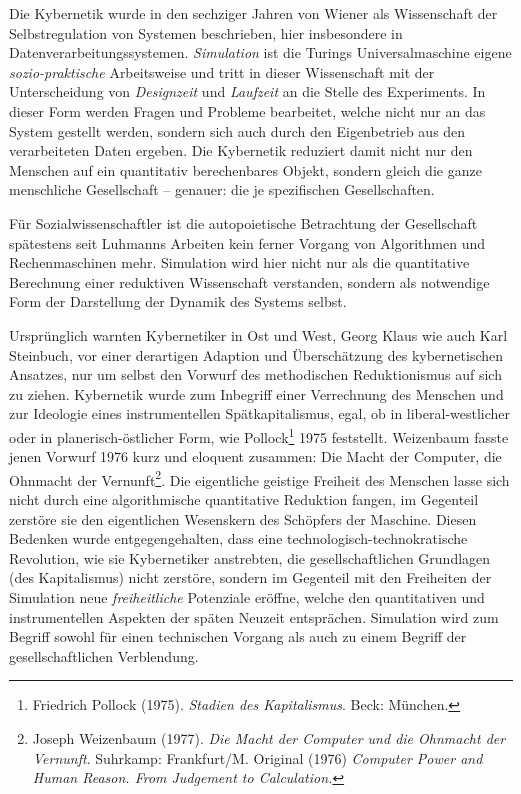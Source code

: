 \documentclass[12pt,a4paper]{article}
\begin{document}
Die Kybernetik wurde in den sechziger Jahren von Wiener als Wissenschaft der
Selbstregulation von Systemen beschrieben, hier insbesondere in
Datenverarbeitungssystemen. \emph{Simulation} ist die Turings
Universalmaschine eigene \emph{sozio-praktische} Arbeitsweise und tritt in
dieser Wissenschaft mit der Unterscheidung von \emph{Designzeit} und
\emph{Laufzeit} an die Stelle des Experiments. In dieser Form werden Fragen
und Probleme bearbeitet, welche nicht nur an das System gestellt werden,
sondern sich auch durch den Eigenbetrieb aus den verarbeiteten Daten
ergeben. Die Kybernetik reduziert damit nicht nur den Menschen auf ein
quantitativ berechenbares Objekt, sondern gleich die ganze menschliche
Gesellschaft -- genauer: die je spezifischen Gesellschaften.

Für Sozialwissenschaftler ist die autopoietische Betrachtung der Gesellschaft
spätestens seit Luhmanns Arbeiten kein ferner Vorgang von Algorithmen und
Rechenmaschinen mehr. Simulation wird hier nicht nur als die quantitative
Berechnung einer reduktiven Wissenschaft verstanden, sondern als notwendige
Form der Darstellung der Dynamik des Systems selbst.

Ursprünglich warnten Kybernetiker in Ost und West, Georg Klaus wie auch Karl
Steinbuch, vor einer derartigen Adaption und Überschätzung des kybernetischen
Ansatzes, nur um selbst den Vorwurf des methodischen Reduktionismus auf sich
zu ziehen. Kybernetik wurde zum Inbegriff einer Verrechnung des Menschen und
zur Ideologie eines instrumentellen Spätkapitalismus, egal, ob in
liberal-westlicher oder in planerisch-östlicher Form, wie
Pollock\footnote{Friedrich Pollock (1975). \emph{Stadien des
    Kapitalismus}. Beck: München. } 1975 feststellt. Weizenbaum fasste jenen
Vorwurf 1976 kurz und eloquent zusammen: Die Macht der Computer, die Ohnmacht
der Vernunft\footnote{Joseph Weizenbaum (1977). \emph{Die Macht der Computer
    und die Ohnmacht der Vernunft}.  Suhrkamp: Frankfurt/M. Original (1976)
  \emph{Computer Power and Human Reason. From Judgement to Calculation.}  }.
Die eigentliche geistige Freiheit des Menschen lasse sich nicht durch eine
algorithmische quantitative Reduktion fangen, im Gegenteil zerstöre sie den
eigentlichen Wesenskern des Schöpfers der Maschine.  Diesen Bedenken wurde
entgegengehalten, dass eine technologisch-technokratische Revolution, wie sie
Kybernetiker anstrebten, die gesellschaftlichen Grundlagen (des Kapitalismus)
nicht zerstöre, sondern im Gegenteil mit den Freiheiten der Simulation neue
\emph{freiheitliche} Potenziale eröffne, welche den quantitativen und
instrumentellen Aspekten der späten Neuzeit entsprächen. Simulation wird zum
Begriff sowohl für einen technischen Vorgang als auch zu einem Begriff der
gesellschaftlichen Verblendung.
\end{document}
